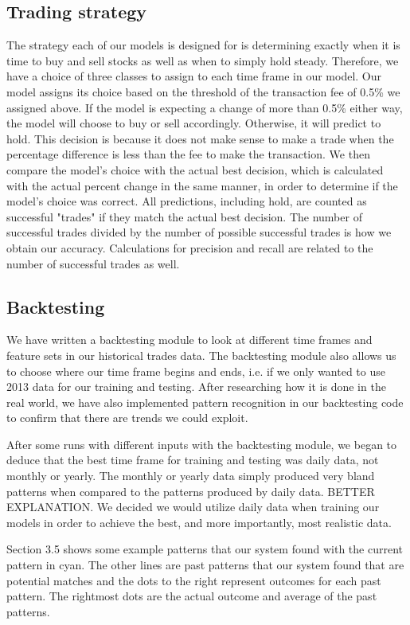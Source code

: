 \documentclass{article}
\begin{document}
\subsection{Trading strategy}
The strategy each of our models is designed for is determining exactly when it is time to buy and sell stocks as well as when to simply hold steady. Therefore, we have a choice of three classes to assign to each time frame in our model. Our model assigns its choice based on the threshold of the transaction fee of 0.5\% we assigned above. If the model is expecting a change of more than 0.5\% either way, the model will choose to buy or sell accordingly. Otherwise, it will predict to hold. This decision is because it does not make sense to make a trade when the percentage difference is less than the fee to make the transaction. We then compare the model's choice with the actual best decision, which is calculated with the actual percent change in the same manner, in order to determine if the model's choice was correct. All predictions, including hold, are counted as successful "trades" if they match the actual best decision. The number of successful trades divided by the number of possible successful trades is how we obtain our accuracy. Calculations for precision and recall are related to the number of successful trades as well.

\subsection{Backtesting}

We have written a backtesting module to look at different time frames and feature sets in our historical trades data. The backtesting module also allows us to choose where our time frame begins and ends, i.e. if we only wanted to use 2013 data for our training and testing. After researching how it is done in the real world, we have also implemented pattern recognition in our backtesting code to confirm that there are trends we could exploit.

After some runs with different inputs with the backtesting module, we began to deduce that the best time frame for training and testing was daily data, not monthly or yearly. The monthly or yearly data simply produced very bland patterns when compared to the patterns produced by daily data. BETTER EXPLANATION. We decided we would utilize daily data when training our models in order to achieve the best, and more importantly, most realistic data.

Section 3.5 shows some example patterns that our system found with the current pattern in cyan.   The other lines are past patterns that our system found that are potential matches and the dots to the right represent outcomes for each past pattern.  The rightmost dots are the actual outcome and average of the past patterns.
\end{document}

